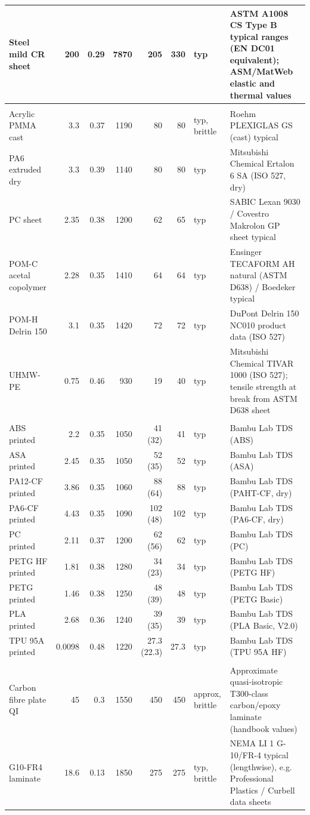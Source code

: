 \begin{center}
\begin{tabularx}{\linewidth}{@{}>{\raggedright\arraybackslash}p{2.75cm}rrrrrlX@{}}
Steel mild CR sheet & 200 & 0.29 & 7870 & 205 & 330 & typ & ASTM A1008 CS Type B typical ranges (EN DC01 equivalent); ASM/MatWeb elastic and thermal values\\
\midrule
\multicolumn{8}{@{}l}{\textit{Plastics}}\\
Acrylic PMMA cast & 3.3 & 0.37 & 1190 & 80 & 80 & typ, brittle & Roehm PLEXIGLAS GS (cast) typical\\
PA6 extruded dry & 3.3 & 0.39 & 1140 & 80 & 80 & typ & Mitsubishi Chemical Ertalon 6 SA (ISO 527, dry)\\
PC sheet & 2.35 & 0.38 & 1200 & 62 & 65 & typ & SABIC Lexan 9030 / Covestro Makrolon GP sheet typical\\
POM-C acetal copolymer & 2.28 & 0.35 & 1410 & 64 & 64 & typ & Ensinger TECAFORM AH natural (ASTM D638) / Boedeker typical\\
POM-H Delrin 150 & 3.1 & 0.35 & 1420 & 72 & 72 & typ & DuPont Delrin 150 NC010 product data (ISO 527)\\
UHMW-PE & 0.75 & 0.46 & 930 & 19 & 40 & typ & Mitsubishi Chemical TIVAR 1000 (ISO 527); tensile strength at break from ASTM D638 sheet\\
\midrule
\multicolumn{8}{@{}l}{\textit{Printed (Bambu Lab data sheets, ISO 527, 100\,\% infill)}}\\
ABS printed & 2.2 & 0.35 & 1050 & 41 (32) & 41 & typ & Bambu Lab TDS (ABS)\\
ASA printed & 2.45 & 0.35 & 1050 & 52 (35) & 52 & typ & Bambu Lab TDS (ASA)\\
PA12-CF printed & 3.86 & 0.35 & 1060 & 88 (64) & 88 & typ & Bambu Lab TDS (PAHT-CF, dry)\\
PA6-CF printed & 4.43 & 0.35 & 1090 & 102 (48) & 102 & typ & Bambu Lab TDS (PA6-CF, dry)\\
PC printed & 2.11 & 0.37 & 1200 & 62 (56) & 62 & typ & Bambu Lab TDS (PC)\\
PETG HF printed & 1.81 & 0.38 & 1280 & 34 (23) & 34 & typ & Bambu Lab TDS (PETG HF)\\
PETG printed & 1.46 & 0.38 & 1250 & 48 (39) & 48 & typ & Bambu Lab TDS (PETG Basic)\\
PLA printed & 2.68 & 0.36 & 1240 & 39 (35) & 39 & typ & Bambu Lab TDS (PLA Basic, V2.0)\\
TPU 95A printed & 0.0098 & 0.48 & 1220 & 27.3 (22.3) & 27.3 & typ & Bambu Lab TDS (TPU 95A HF)\\
\midrule
\multicolumn{8}{@{}l}{\textit{Composites}}\\
Carbon fibre plate QI & 45 & 0.3 & 1550 & 450 & 450 & approx, brittle & Approximate quasi-isotropic T300-class carbon/epoxy laminate (handbook values)\\
G10-FR4 laminate & 18.6 & 0.13 & 1850 & 275 & 275 & typ, brittle & NEMA LI 1 G-10/FR-4 typical (lengthwise), e.g. Professional Plastics / Curbell data sheets\\
\bottomrule
\end{tabularx}
\end{center}

